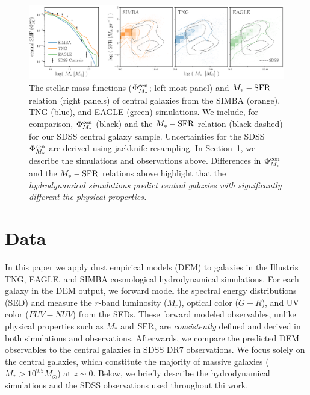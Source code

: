 \begin{figure}
\begin{center}
    \includegraphics[width=\textwidth]{figs/smf_m_sfr.pdf}
    \caption{\label{fig:smf_msfr}
    The stellar mass functions ($\Phi^{\rm cen}_{M_*}$; left-most panel) and
    $M_*-{\rm SFR}$ relation (right panels) of central galaxies from the SIMBA
    (orange), TNG (blue), and EAGLE (green) simulations. We include, for
    comparison, $\Phi^{\rm cen}_{M_*}$ (black) and the $M_*-{\rm SFR}$ relation
    (black dashed) for our SDSS central galaxy sample. Uncertainties for 
    the SDSS $\Phi^{\rm cen}_{M_*}$ are derived using jackknife resampling. 
    In Section~\ref{sec:sims}, we describe the simulations and observations 
    above. Differences in $\Phi^{\rm cen}_{M_*}$ and the $M_*-{\rm SFR}$ relations 
    above highlight that the \emph{hydrodynamical simulations predict central 
    galaxies with significantly different the physical properties.}
    }
\end{center}
\end{figure}

\section{Data}\label{sec:sims}
In this paper we apply dust empirical models (DEM) to galaxies in the Illustris
TNG, EAGLE, and SIMBA cosmological hydrodynamical simulations. For each galaxy
in the DEM output, we forward model the spectral energy distributions (SED) and
measure the $r$-band luminosity ($M_r$), optical color ($G-R$), and UV color
($FUV-NUV$) from the SEDs. These forward modeled observables, unlike physical
properties such as $M_*$ and ${\rm SFR}$, are \emph{consistently} defined and
derived in both simulations and observations.  Afterwards, we compare the
predicted DEM observables to the central galaxies in SDSS DR7 observations.  
We focus solely on the central galaxies, which constitute the majority of
massive galaxies ($M_* > 10^{9.5}M_\odot$) at $z\sim0$. Below, we briefly describe
the hydrodynamical simulations and the SDSS observations used throughout thi
work.

